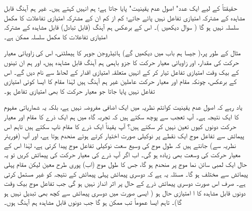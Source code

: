 حقیقتاً      کے لیے ایک عدد"  اصول عدم یقینیت"  پایا جاتا ہے؛ ہم انہیں  کہتے ہیں۔ غیر ہم آہنگ قابل مشاہدہ کے مشترکہ امتیازی تفاعل نہیں پائے جاتے؛  کم از کم ان کے مشترکہ امتیازی تفاعلات  کا مکمل  سلسلہ نہیں ہو گا ( سوال     دیکھیں )۔ اس کے برعکس ہم آہنگ (قابل تبادل)  قابل مشاہدہ  کے  مشترکہ امتیازی تفاعلات کا مکمل سلسلہ ممکن ہے۔


مثال کے طور پر،(  جیسا ہم باب   میں دیکھیں گے)   ہائیڈروجن جوہر کا ہیملٹنی،  اس کی زاویائی معیار حرکت کی مقدار،  اور زاویائی معیار حرکت کا  جزو  باہمی ہم آہنگ قابل مشاہدہ ہیں،  اور ہم ان تینوں کے بیک وقت امتیازی تفاعل تیار کر  کے  انہیں متعلقہ امتیازی اقدار کے لحاظ سے نام دیں گے۔ اس کے برعکس، چونکہ مقام اور معیار حرکت   عاملین غیر ہم آہنگ ہیں لہٰذا  مقام کا ایسا کوئی امتیازی تفاعل نہیں پایا جاتا جو معیار حرکت کا بھی امتیازی تفاعل ہو۔

 یاد رہے کہ اصول  عدم یقینیت   کوانٹم نظریہ میں ایک اضافی مفروضہ نہیں ہے،  بلکہ یہ شماریاتی مفہوم کا ایک نتیجہ ہے۔ آپ تعجب  سے پوچھ سکتے ہیں کہ تجربہ گاہ میں ہم ایک ذرے کا مقام اور معیار حرکت دونوں  کیوں تعین نہیں کر سکتے ہیں؟  آپ یقیناً ایک ذرے کا مقام  ناپ سکتے ہیں تاہم اس   پیمائش سے تفاعل موج ایک نقطے پر نوکیلی صورت اختیار کرتے ہوئے  منحدم  ہوتا  ہے،  اور آپ (فوریئر نظریہ سے)  جانتے ہیں کہ طول موج کی وسیع سعت نوکیلی تفاعل موج پیدا کرتی ہے،  لہٰذا اس کے  معیار حرکت کی وسعت بھی زیادہ ہو گی۔ اب اگر آپ ذرے کی  معیار حرکت کی پیمائش کریں تو  یہ حال  ایک لمبی سائن  نما موج پر منحدم ہو گا،  جس کا  طول موج (اب)   پوری طرح معین  لیکن    مقام پہلی پیمائش سے مختلف ہو گا۔  مسئلہ یہ ہے کہ دوسری پیمائش پہلی پیمائش کے نتیجہ کو  غیر مستمل کرتی ہے۔ صرف اس صورت  دوسری پیمائش ذرے  کے حال پر اثر انداز نہیں ہو گی  جب تفاعل موج بیک وقت دونوں قابل مشاہدہ  کا ا امتیازی حال ہو ( ایسی صورت میں دوسری پیمائش سے کچھ بھی تبدیل نہیں ہو گا)۔ تاہم  ایسا عموماً تب ممکن ہو گا جب  دونوں قابل مشاہدہ ہم آہنگ ہوں۔
 
